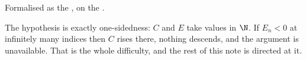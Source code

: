 \noindent Formalised as the
, on the
.

The hypothesis is exactly one-sidedness: $C$ and $E$ take values in $\N$.  If
$E_n<0$ at infinitely many indices then $C$ rises there, nothing descends, and
the argument is unavailable.  That is the whole difficulty, and the rest of
this note is directed at it.
